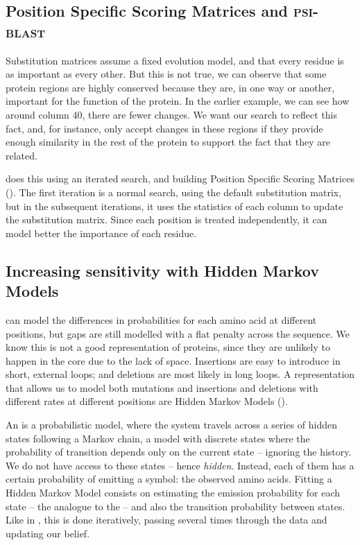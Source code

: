 \subsection[\PSSMs{} and  \PSIBLAST]{Position Specific Scoring Matrices and \textsc{psi-blast}}

Substitution matrices assume a fixed evolution model, and that every residue is as important as every other.
But this is not true, we can observe that some protein regions are highly conserved because they are, in one way or another, important for the function of the protein.
In the earlier example, we can see how around column 40, there are fewer changes.
We want our search to reflect this fact, and, for instance, only accept changes in these regions if they provide enough similarity in the rest of the protein to support the fact that they are related.

\PSIBLAST{} \citep{psiblast} does this using an iterated search, and building Position Specific Scoring Matrices (\PSSM).
The first iteration is a normal \BLAST{} search, using the default substitution matrix, but in the subsequent iterations, it uses the statistics of each column to update the substitution matrix.
Since each position is treated independently, it can model better the importance of each residue.

\subsection[Hidden Markov Models]{Increasing sensitivity with Hidden Markov Models}
\PSSMs{} can model the differences in probabilities for each amino acid at different positions, but gaps are still modelled with a flat penalty across the sequence.
We know this is not a good representation of proteins, since they are unlikely to happen in the core due to the lack of space.
Insertions are easy to introduce in short, external loops; and deletions are most likely in long loops. 
A representation that allows us to model both mutations and insertions and deletions with different rates at different positions are Hidden Markov Models (\HMM).

An \HMM{}  is a probabilistic model, where the system travels across a series of hidden states following a Markov chain, a model with discrete states where the probability of transition depends only on the current state -- ignoring the history.
We do not have access to these states -- hence \emph{hidden}.
Instead, each of them has a certain probability of emitting a symbol: the observed amino acids.
Fitting a Hidden Markov Model consists on estimating the emission probability for each state -- the analogue to the \PSSMs{} -- and also the transition probability between states.
Like in \PSIBLAST, this is done iteratively, passing several times through the data and updating our belief.

